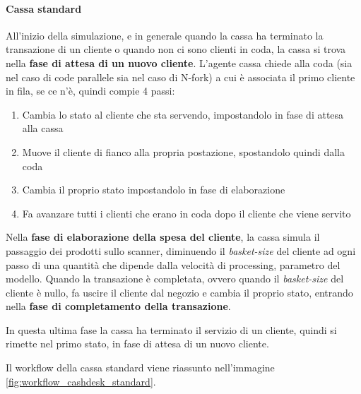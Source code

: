 \paragraph{Cassa standard}
All'inizio della simulazione, e in generale quando la cassa ha terminato la transazione di un cliente o quando non ci sono clienti in coda, la cassa si trova nella \textbf{fase di attesa di un nuovo cliente}. L'agente cassa chiede alla coda (sia nel caso di code parallele sia nel caso di N-fork) a cui è associata il primo cliente in fila, se ce n'è, quindi compie 4 passi:
\begin{enumerate}
\item Cambia lo stato al cliente che sta servendo, impostandolo in fase di attesa alla cassa
\item Muove il cliente di fianco alla propria postazione, spostandolo quindi dalla coda
\item Cambia il proprio stato impostandolo in fase di elaborazione
\item Fa avanzare tutti i clienti che erano in coda dopo il cliente che viene servito
\end{enumerate}

Nella \textbf{fase di elaborazione della spesa del cliente}, la cassa simula il passaggio dei prodotti sullo scanner, diminuendo il \textit{basket-size} del cliente ad ogni passo di una quantità che dipende dalla velocità di processing, parametro del modello. Quando la transazione è completata, ovvero quando il \textit{basket-size} del cliente è nullo, fa uscire il cliente dal negozio e cambia il proprio stato, entrando nella \textbf{fase di completamento della transazione}.

In questa ultima fase la cassa ha terminato il servizio di un cliente, quindi si rimette nel primo stato, in fase di attesa di un nuovo cliente.

Il workflow della cassa standard viene riassunto nell'immagine \ref{fig:workflow_cashdesk_standard}.

